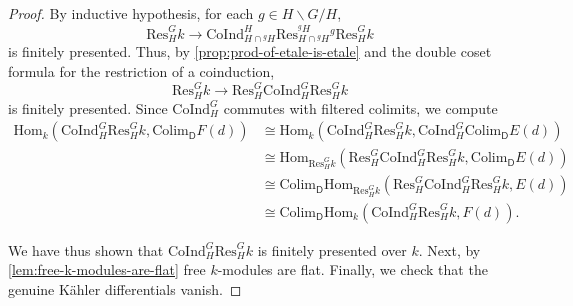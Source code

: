 \documentclass[11pt,dvipsnames]{amsart}
\theoremstyle{BoldRemark}
\newcommand{\Res}{\mathrm{Res}}
\newcommand{\Coind}{\mathrm{CoInd}}
\newcommand{\Hom}{\mathrm{Hom}}
\newcommand{\colim}{\mathrm{Colim}}
\begin{document}
\begin{proof}
    By inductive hypothesis, for each $g \in H \backslash G / H$,
    \[ 
        \Res_H^G k \rightarrow \Coind_{H \cap {}^g H}^H \Res_{H \cap {}^g H}^{{}^g H} {}^g \Res_H^G k 
    \] 
    is finitely presented. Thus, by \cref{prop:prod-of-etale-is-etale} and the double coset formula for the restriction of a coinduction, 
    \[ 
        \Res_H^G k \rightarrow \Res_H^G \Coind_H^G \Res_H^G k 
    \] 
    is finitely presented. Since $\Coind_H^G$ commutes with filtered colimits, we compute 
    \begin{align*}
        \Hom_k(\Coind_H^G \Res_H^G k, \colim_{\mathsf{D}} F(d)) & \cong \Hom_k (\Coind_H^G \Res_H^G k, \Coind_H^G \colim_{\mathsf{D}} E(d)) \\
        & \cong \Hom_{\Res_H^G k}(\Res_H^G \Coind_H^G \Res_H^G k, \colim_{\mathsf{D}} E(d)) \\
        & \cong \colim_{\mathsf{D}} \Hom_{\Res_H^G k}(\Res_H^G \Coind_H^G \Res_H^G k,E(d)) \\
        & \cong \colim_{\mathsf{D}} \Hom_{k}(\Coind_H^G \Res_H^G k,F(d)) . 
    \end{align*}
    
    We have thus shown that $\Coind_H^G \Res_H^G k$ is finitely presented over $k$. Next, by \cref{lem:free-k-modules-are-flat} free $k$-modules are flat. Finally, we check that the genuine K\"{a}hler differentials vanish.


\end{proof}
\end{document}
